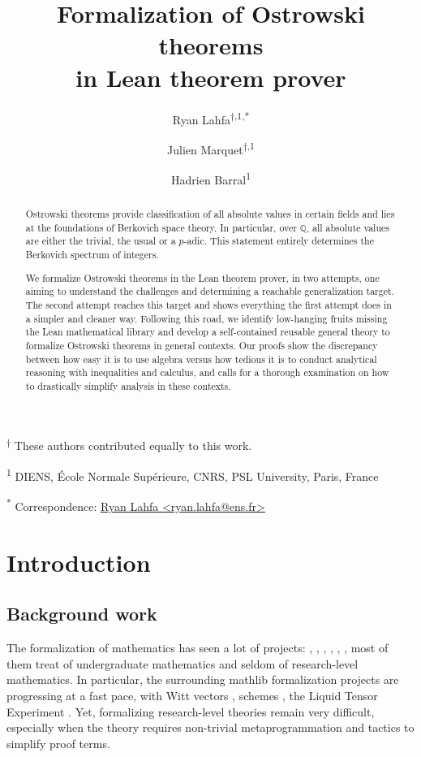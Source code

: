 \documentclass[
]{article}
\title{Formalization of Ostrowski theorems\\
in Lean theorem prover}
\author{Ryan Lahfa\textsuperscript{$\dagger{}$,1,*} \and Julien Marquet\textsuperscript{$\dagger{}$,1} \and Hadrien Barral\textsuperscript{1}}
\date{}
\newcommand{\Q}{\mathbb{Q}}
\begin{document}
\maketitle
\begin{abstract}
Ostrowski theorems provide classification of all absolute values in
certain fields and lies at the foundations of Berkovich space theory. In
particular, over \(\Q\), all absolute values are either the trivial, the
usual or a \(p\)-adic. This statement entirely determines the Berkovich
spectrum of integers.

We formalize Ostrowski theorems in the Lean theorem prover, in two
attempts, one aiming to understand the challenges and determining a
reachable generalization target. The second attempt reaches this target
and shows everything the first attempt does in a simpler and cleaner
way. Following this road, we identify low-hanging fruits missing the
Lean mathematical library and develop a self-contained reusable general
theory to formalize Ostrowski theorems in general contexts. Our proofs
show the discrepancy between how easy it is to use algebra versus how
tedious it is to conduct analytical reasoning with inequalities and
calculus, and calls for a thorough examination on how to drastically
simplify analysis in these contexts.
\end{abstract}

\textsuperscript{$\dagger{}$}
These authors contributed equally to this work.

\textsuperscript{1} DIENS, École Normale Supérieure, CNRS, PSL
University, Paris, France

\textsuperscript{*} Correspondence:
\href{mailto:ryan.lahfa@ens.fr}{Ryan Lahfa
\textless{}ryan.lahfa@ens.fr\textgreater{}}

\hypertarget{introduction}{%
\section{Introduction}\label{introduction}}

\hypertarget{background-work}{%
\subsection{Background work}\label{background-work}}

The formalization of mathematics has seen a lot of projects:
\cite{wiedijkQEDManifestoRevisited}, \autocite{abelruffinicoq},
\autocite{feitthompsoncoq}, \autocite{buzzard2020perfectoids},
\autocite{lewis2019hensel}, \autocite{commelin2021witt}, most of them
treat of undergraduate mathematics and seldom of research-level
mathematics. In particular, the surrounding mathlib
\autocite{The_mathlib_Community_2020} formalization projects are
progressing at a fast pace, with Witt vectors
\autocite{commelin2021witt}, schemes \autocite{buzzard2021schemes}, the
Liquid Tensor Experiment \autocite{scholze2021liquid}. Yet, formalizing
research-level theories remain very difficult, especially when the
theory requires non-trivial metaprogrammation and tactics to simplify
proof terms.
\end{document}
